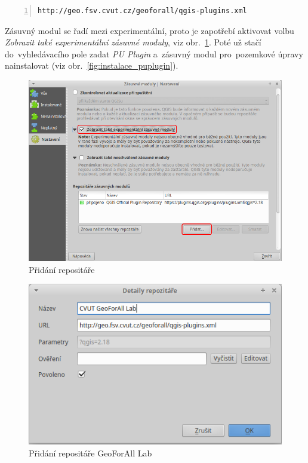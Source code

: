 \begin{lstlisting}[basicstyle=\footnotesize\ttfamily, backgroundcolor = \color{light-gray},  numbers=left]
http://geo.fsv.cvut.cz/geoforall/qgis-plugins.xml
\end{lstlisting}

Zásuvný modul se řadí mezi experimentální, proto je zapotřebí aktivovat volbu \textit{Zobrazit také experimentální zásuvné moduly}, viz obr.~\ref{fig:pridani_repozitare}. Poté už stačí do~vyhledávacího pole zadat \textit{PU Plugin} a~zásuvný modul pro~pozemkové úpravy nainstalovat (viz obr.~\ref{fig:instalace_puplugin}).

	\begin{figure}[H]
		\centering
		\includegraphics[width=.9\textwidth]{./pictures/pridani_repozitare.png}
		\caption[Přidání repositáře]{Přidání repositáře}
		\label{fig:pridani_repozitare}
 	\end{figure}
 	
	\begin{figure}[H]
		\centering
		\includegraphics[width=.6\textwidth]{./pictures/pridani_repozitare-geoforall_lab.png}
		\caption[Přidání repositáře GeoForAll Lab]{Přidání repositáře GeoForAll Lab}
		\label{fig:pridani_repozitare_geoforall_lab}
 	\end{figure}

